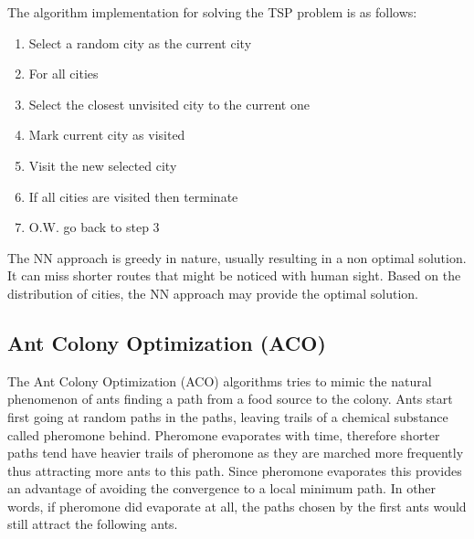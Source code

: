 \documentclass[twocolumn]{article}
\begin{document}
	The algorithm implementation for solving the TSP problem is as follows:
	\begin{enumerate}
		\item Select a random city as the current city
		\item For all cities
		\item Select the closest unvisited city to the current one
		\item Mark current city as visited
		\item Visit the new selected city
		\item If all cities are visited then terminate
		\item O.W. go back to step 3
	\end{enumerate}
	
	The NN approach is greedy in nature, usually resulting in a non optimal solution. It can miss shorter routes that might be noticed with human sight. Based on the distribution of cities, the NN approach may provide the optimal solution.
	
	\subsection{Ant Colony Optimization (ACO)}
	The Ant Colony Optimization (ACO) algorithms tries to mimic the natural phenomenon of ants finding a path from a food source to the colony. Ants start first going at random paths in the paths, leaving trails of a chemical substance called pheromone behind. Pheromone evaporates with time, therefore shorter paths tend have heavier trails of pheromone as they are marched more frequently thus attracting more ants to this path. Since pheromone evaporates this provides an advantage of avoiding the convergence to a local minimum path. In other words, if pheromone did evaporate at all, the paths chosen by the first ants would still attract the following ants.
	
\end{document}
